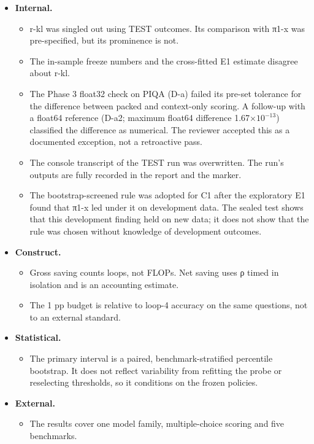\begin{itemize}
\tightlist
\item
  \textbf{Internal.}

  \begin{itemize}
  \tightlist
  \item
    r-kl was singled out using TEST outcomes. Its comparison with π1-x was pre-specified, but its prominence is not.
  \item
    The in-sample freeze numbers and the cross-fitted E1 estimate disagree about r-kl.
  \item
    The Phase 3 float32 check on PIQA (D-a) failed its pre-set tolerance for the difference between packed and context-only scoring. A
    follow-up with a float64 reference (D-a2; maximum float64 difference 1.67\(\times 10^{-13}\)) classified the difference as numerical. The reviewer
    accepted this as a documented exception, not a retroactive pass.
  \item
    The console transcript of the TEST run was overwritten. The run's outputs are fully recorded in the report and the marker.
  \item
    The bootstrap-screened rule was adopted for C1 after the exploratory E1 found that π1-x led under it on development data. The sealed test shows that this development finding held on new data; it does not show that the rule was chosen without knowledge of development outcomes.
  \end{itemize}
\item
  \textbf{Construct.}

  \begin{itemize}
  \tightlist
  \item
    Gross saving counts loops, not FLOPs. Net saving uses ρ timed in isolation and is an accounting estimate.
  \item
    The 1 pp budget is relative to loop-4 accuracy on the same questions, not to an external standard.
  \end{itemize}
\item
  \textbf{Statistical.}

  \begin{itemize}
  \tightlist
  \item
    The primary interval is a paired, benchmark-stratified percentile bootstrap. It does not reflect variability from refitting the probe or
    reselecting thresholds, so it conditions on the frozen policies.
  \end{itemize}
\item
  \textbf{External.}

  \begin{itemize}
  \tightlist
  \item
    The results cover one model family, multiple-choice scoring and five benchmarks.
  \end{itemize}
\end{itemize}

